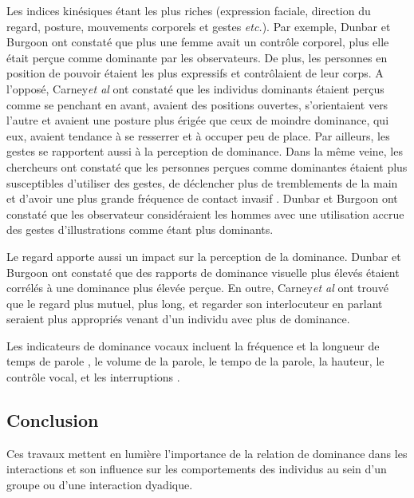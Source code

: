 			 Les indices kinésiques étant les plus riches (expression faciale, direction du regard, posture, mouvements corporels et gestes \emph{etc.}).
			Par exemple, Dunbar et Burgoon \cite{dunbar2005perceptions} ont constaté que plus une femme avait un contrôle corporel, plus elle était perçue comme dominante par les observateurs. De plus, les personnes en position de pouvoir  étaient les plus expressifs et  contrôlaient de leur corps.
			A l'opposé,  Carney\emph{et al}\cite{hall2005nonverbal} ont constaté que les individus dominants étaient perçus comme se penchant en avant, avaient des positions ouvertes, s'orientaient vers l'autre et avaient une posture plus érigée que ceux de moindre dominance, qui eux, avaient tendance à se resserrer et à occuper peu de place. Par ailleurs, les gestes se rapportent aussi à la perception de dominance.  
			Dans la même veine, les chercheurs ont constaté que les personnes perçues comme dominantes étaient plus susceptibles d'utiliser des gestes, de déclencher plus de tremblements de la main et d'avoir une plus grande fréquence de contact invasif \cite{hall2005nonverbal}.
			 Dunbar et Burgoon \cite{dunbar2005perceptions} ont constaté que les observateur considéraient les hommes avec une utilisation accrue des gestes d'illustrations comme étant plus dominants.
			
			Le regard apporte aussi un impact sur la perception de la dominance. Dunbar et Burgoon \cite{dunbar2005perceptions} ont constaté que des rapports de dominance visuelle plus élevés étaient corrélés à une dominance plus élevée perçue. En outre, Carney\emph{et al} \cite{hall2005nonverbal} ont trouvé que le regard plus mutuel, plus long, et regarder son interlocuteur en parlant seraient plus appropriés venant d'un individu avec plus de dominance.
			
			Les indicateurs de dominance vocaux incluent la fréquence et la longueur de temps de parole \cite{mast2002dominance}, le volume de la parole, le tempo de la parole, la hauteur, le contrôle vocal, et les interruptions \cite{dunbar2005perceptions}.
		
		\subsection{Conclusion}
			
			Ces travaux mettent en lumière l'importance de la relation de dominance dans les interactions et son influence sur les comportements des individus au sein d'un groupe ou d'une interaction dyadique.
			
